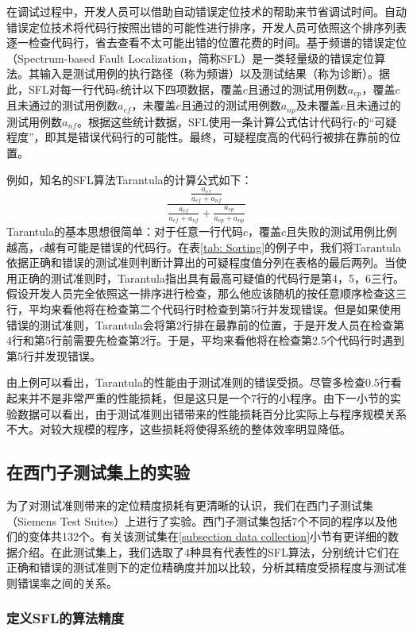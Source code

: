 在调试过程中，开发人员可以借助自动错误定位技术的帮助来节省调试时间。自动错误定位技术将代码行按照出错的可能性进行排序，开发人员可依照这个排序列表逐一检查代码行，省去查看不太可能出错的位置花费的时间。基于频谱的错误定位（Spectrum-based Fault Localization，简称SFL）是一类轻量级的错误定位算法。其输入是测试用例的执行路径（称为频谱）以及测试结果（称为诊断）。据此，SFL对每一行代码$c$统计以下四项数据，覆盖$c$且通过的测试用例数$a_{ep}$，覆盖$c$且未通过的测试用例数$a_{ef}$，未覆盖$c$且通过的测试用例数$a_{np}$及未覆盖$c$且未通过的测试用例数$a_{nf}$。根据这些统计数据，SFL使用一条计算公式估计代码行$c$的“可疑程度”，即其是错误代码行的可能性。最终，可疑程度高的代码行被排在靠前的位置。

例如，知名的SFL算法Tarantula\cite{jones2002visualization}的计算公式如下：
$$
\frac{\frac{a_{ef}}{a_{ef} + a_{nf}}}{\frac{a_{ef}}{a_{ef} + a_{nf}} + \frac{a_{ep}}{a_{ep} + a_{np}}}
$$
Tarantula的基本思想很简单：对于任意一行代码$c$，覆盖$c$且失败的测试用例比例越高，$c$越有可能是错误的代码行。在表\ref{tab: Sorting}的例子中，我们将Tarantula依据正确和错误的测试准则判断计算出的可疑程度值分列在表格的最后两列。当使用正确的测试准则时，Tarantula指出具有最高可疑值的代码行是第4，5，6三行。假设开发人员完全依照这一排序进行检查，那么他应该随机的按任意顺序检查这三行，平均来看他将在检查第二个代码行时检查到第5行并发现错误。但是如果使用错误的测试准则，Tarantula会将第2行排在最靠前的位置，于是开发人员在检查第4行和第5行前需要先检查第2行。于是，平均来看他将在检查第2.5个代码行时遇到第5行并发现错误。

由上例可以看出，Tarantula的性能由于测试准则的错误受损。尽管多检查$0.5$行看起来并不是非常严重的性能损耗，但是这只是一个7行的小程序。由下一小节的实验数据可以看出，由于测试准则出错带来的性能损耗百分比实际上与程序规模关系不大。对较大规模的程序，这些损耗将使得系统的整体效率明显降低。

\subsection{在西门子测试集上的实验}

为了对测试准则带来的定位精度损耗有更清晰的认识，我们在西门子测试集（Siemens Test Suites）上进行了实验。西门子测试集包括7个不同的程序以及他们的变体共132个。有关该测试集在\ref{subsection data collection}小节有更详细的数据介绍。在此测试集上，我们选取了4种具有代表性的SFL算法，分别统计它们在正确和错误的测试准则下的定位精确度并加以比较，分析其精度受损程度与测试准则错误率之间的关系。

\subsubsection{定义SFL的算法精度}

